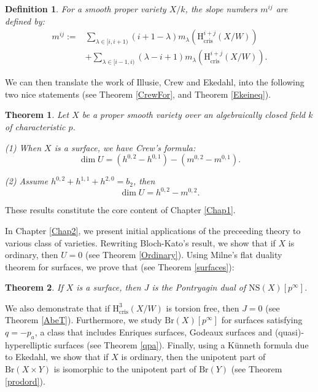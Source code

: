 \documentclass[a4paper,12pt,twoside]{report}
\newtheorem*{theorem*}{Theorem}
\newtheorem*{definition*}{Definition}
\newcommand{\cris}{\mathrm{cris}}
\newcommand{\Br}{\mathrm{Br}}
\newcommand{\NS}{\mathrm{NS}}
\newcommand{\HH}{\mathrm{H}}
\begin{document}
\begin{definition*}
    For a smooth proper variety $X/k$, \emph{the slope numbers} $m^{ij}$ are defined by:
\begin{equation}
    \begin{aligned}
    m^{ij}:=&\sum_{\lambda\in [i,i+1)}(i+1-\lambda)m_{\lambda}(\HH^{i+j}_{\cris}(X/W))\\
    &+\sum_{\lambda\in [i-1,i)}(\lambda-i+1) m_{\lambda}(\HH^{i+j}_{\cris}(X/W)).
    \end{aligned}
\end{equation}
\end{definition*}

We can then translate the work of Illusie, Crew and Ekedahl, into the following two nice statements (see Theorem \ref{CrewFor}, and Theorem \ref{Ekeineq}).

\begin{theorem*} Let $X$ be a proper smooth variety over an algebraically closed field $k$ of characteristic $p$. 

    {\rm (1)} When $X$ is a surface, we have Crew's formula: 
    \[\dim U=(h^{0,2}-h^{0,1})-(m^{0,2}-m^{0,1}).\]

    {\rm (2)} Assume $h^{0,2}+h^{1,1}+h^{2,0}=b_2$, then 
    \[\dim U=h^{0,2}-m^{0,2}.\]

\end{theorem*}

These results constitute the core content of Chapter \ref{Chap1}. 

In Chapter \ref{Chap2}, we present initial applications of the preceeding theory to various class of varieties.  
Rewriting Bloch-Kato's result, we show that if $X$ is ordinary, then $U=0$ (see Theorem \ref{Ordinary}). 
Using Milne's flat duality theorem for surfaces, we prove that (see Theorem \ref{surfaces}): 
\begin{theorem*}
    If $X$ is a surface, 
then $J$ is the Pontryagin dual of $\NS(X)[p^{\infty}]$. 
\end{theorem*} 
We also demonstrate that if $\HH^3_{\cris}(X/W)$ is torsion free, then $J=0$ (see Theorem \ref{AbeT}). 
Furthermore, we study $\Br(X)[p^\infty]$ for surfaces satisfying $q=-p_a$, a 
class that includes Enriques surfaces, Godeaux surfaces and (quasi)-hyperelliptic surfaces (see Theorem \ref{qpa}). 
Finally, using a K\"unneth formula due to Ekedahl, we show that if $X$ is ordinary, 
then the unipotent part of $\Br(X\times Y)$ is isomorphic to the unipotent part of $\Br(Y)$ (see Theorem \ref{prodord}). 
\end{document}

